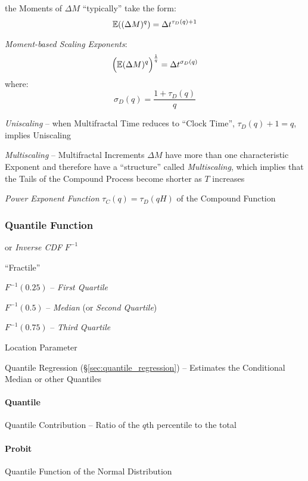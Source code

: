 the Moments of $\Delta M$ ``typically'' take the form:
\[
  \mathbb{E}((\Delta M)^q) = \Delta t^{\tau_D(q) + 1}
\]

\emph{Moment-based Scaling Exponents}:
\[
  \Big(\mathbb{E}(\Delta M)^q\Big)^\frac{1}{q} = \Delta t^{\sigma_D(q)}
\]
where:
\[
  \sigma_D(q) = \frac{1 + \tau_D(q)}{q}
\]

\emph{Uniscaling} -- when Multifractal Time reduces to ``Clock Time'',
$\tau_D(q) + 1 = q$, implies Uniscaling

\emph{Multiscaling} -- Multifractal Increments $\Delta M$ have more than one
characteristic Exponent and therefore have a ``structure'' called
\emph{Multiscaling}, which implies that the Tails of the Compound Process become
shorter as $T$ increases

\emph{Power Exponent Function} $\tau_C(q) = \tau_D(qH)$ of the Compound Function



\subsubsection{Quantile Function}\label{sec:quantile_function}

or \emph{Inverse CDF} $F^{-1}$

``Fractile''

$F^{-1}(0.25)$ -- \emph{First Quartile}

$F^{-1}(0.5)$ -- \emph{Median} (or \emph{Second Quartile})

$F^{-1}(0.75)$ -- \emph{Third Quartile}

Location Parameter

Quantile Regression (\S\ref{sec:quantile_regression}) -- Estimates the
Conditional Median or other Quantiles



\paragraph{Quantile}\label{sec:quantile}\hfill

Quantile Contribution -- Ratio of the $q$th percentile to the total



\paragraph{Probit}\label{sec:probit}\hfill

Quantile Function of the Normal Distribution



